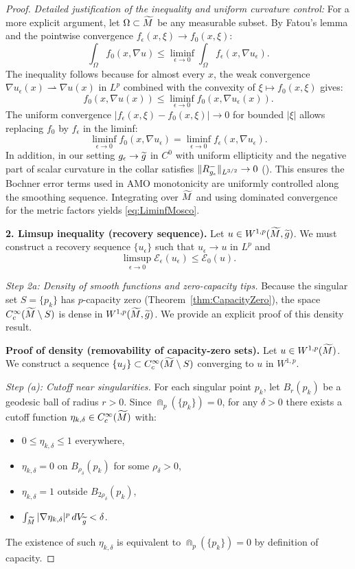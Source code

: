 \begin{proof}
\textit{Detailed justification of the inequality and uniform curvature control:}
For a more explicit argument, let $\Omega \subset \widetilde{M}$ be any measurable subset. By Fatou's lemma and the pointwise convergence $f_\epsilon(x,\xi) \to f_0(x,\xi)$:
\[
    \int_\Omega f_0(x, \nabla u) \le \liminf_{\epsilon \to 0} \int_\Omega f_\epsilon(x, \nabla u_\epsilon).
\]
The inequality follows because for almost every $x$, the weak convergence $\nabla u_\epsilon(x) \rightharpoonup \nabla u(x)$ in $L^p$ combined with the convexity of $\xi \mapsto f_0(x,\xi)$ gives:
\[
    f_0(x, \nabla u(x)) \le \liminf_{\epsilon \to 0} f_0(x, \nabla u_\epsilon(x)).
\]
The uniform convergence $|f_\epsilon(x,\xi) - f_0(x,\xi)| \to 0$ for bounded $|\xi|$ allows replacing $f_0$ by $f_\epsilon$ in the liminf:
\[
    \liminf_{\epsilon \to 0} f_0(x, \nabla u_\epsilon) = \liminf_{\epsilon \to 0} f_\epsilon(x, \nabla u_\epsilon).
\]
In addition, in our setting $g_{\epsilon}\to\widetilde{g}$ in $C^0$ with uniform ellipticity and the negative part of scalar curvature in the collar satisfies $\|R_{g_{\epsilon}}^-\|_{L^{3/2}}\to 0$ (). This ensures the Bochner error terms used in AMO monotonicity are uniformly controlled along the smoothing sequence. Integrating over $\widetilde{M}$ and using dominated convergence for the metric factors yields \eqref{eq:LiminfMosco}.

\textbf{2. Limsup inequality (recovery sequence).}
Let $u \in W^{1,p}(\widetilde{M},\widetilde{g})$. We must construct a recovery sequence $\{u_\epsilon\}$ such that $u_\epsilon \to u$ in $L^p$ and
\[
    \limsup_{\epsilon \to 0} \mathcal{E}_\epsilon(u_\epsilon) \le \mathcal{E}_0(u).
\]

\textit{Step 2a: Density of smooth functions and zero-capacity tips.}
Because the singular set $S=\{p_k\}$ has $p$-capacity zero (Theorem~\ref{thm:CapacityZero}), the space $C^\infty_c(\widetilde{M} \setminus S)$ is dense in $W^{1,p}(\widetilde{M}, \widetilde{g})$. We provide an explicit proof of this density result.

\textbf{Proof of density (removability of capacity-zero sets).}
Let $u \in W^{1,p}(\widetilde{M})$. We construct a sequence $\{u_j\} \subset C^\infty_c(\widetilde{M} \setminus S)$ converging to $u$ in $W^{1,p}$.

\textit{Step (a): Cutoff near singularities.} For each singular point $p_k$, let $B_r(p_k)$ be a geodesic ball of radius $r > 0$. Since $\Cap_p(\{p_k\}) = 0$, for any $\delta > 0$ there exists a cutoff function $\eta_{k,\delta} \in C^\infty_c(\widetilde{M})$ with:
\begin{itemize}
    \item $0 \le \eta_{k,\delta} \le 1$ everywhere,
    \item $\eta_{k,\delta} = 0$ on $B_{\rho_\delta}(p_k)$ for some $\rho_\delta > 0$,
    \item $\eta_{k,\delta} = 1$ outside $B_{2\rho_\delta}(p_k)$,
    \item $\int_{\widetilde{M}} |\nabla \eta_{k,\delta}|^p \, dV_{\widetilde{g}} < \delta$.
\end{itemize}
The existence of such $\eta_{k,\delta}$ is equivalent to $\Cap_p(\{p_k\}) = 0$ by definition of capacity.


\end{proof}
